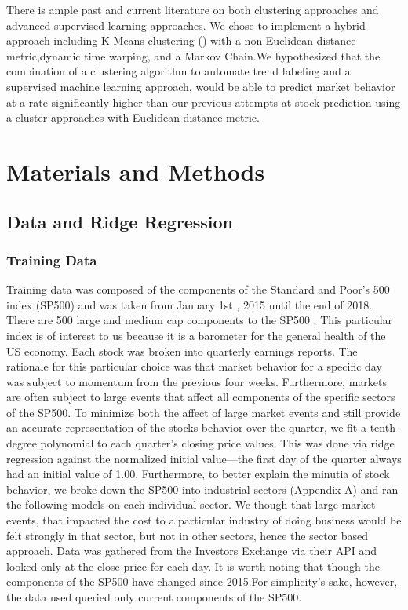 \documentclass{article}
\begin{document}
There is ample past and current literature on both clustering approaches and advanced supervised learning approaches. We chose to implement a hybrid approach including K Means clustering (\cite{murphy}) with a non-Euclidean distance metric,dynamic time warping, and a Markov Chain.We hypothesized that the combination of a clustering algorithm to automate trend labeling and a supervised machine learning approach, would be able to predict market behavior at a rate significantly higher than our previous attempts at stock prediction using a cluster approaches with Euclidean distance metric.  


\section{Materials and Methods}
\subsection{Data and Ridge Regression}
\subsubsection{Training Data}
Training data was composed of the components of the Standard and Poor’s 500 index (SP500) and was taken from January 1st , 2015  until the end of 2018. There are 500 large and medium cap components to the SP500 . This particular index is of interest to us because it is a barometer for the general health of the US economy. Each stock was broken into quarterly earnings reports. The rationale for this particular choice was that market behavior for a specific day was subject to momentum from the previous four weeks. Furthermore, markets are often subject to large events that affect all components of the specific sectors of the SP500. 
To minimize both the affect of large market events and still provide an accurate representation of the stocks behavior over the quarter, we fit a tenth-degree polynomial to each quarter’s closing price values. This was done via ridge regression against the normalized initial value—the first day of the quarter always had an initial value of 1.00. Furthermore, to better explain the minutia of stock behavior, we broke down the SP500 into industrial sectors (Appendix A) and ran the following models on each individual sector. We though that large market events, that impacted the cost to a particular industry of doing business would be felt strongly in that sector, but not in other sectors, hence the sector based approach. 
Data was gathered from the Investors Exchange via their API and looked only at the close price for each day. It is worth noting that though the components of the SP500 have changed since 2015.For simplicity's sake, however, the data used queried only current components of the SP500.
\end{document}
